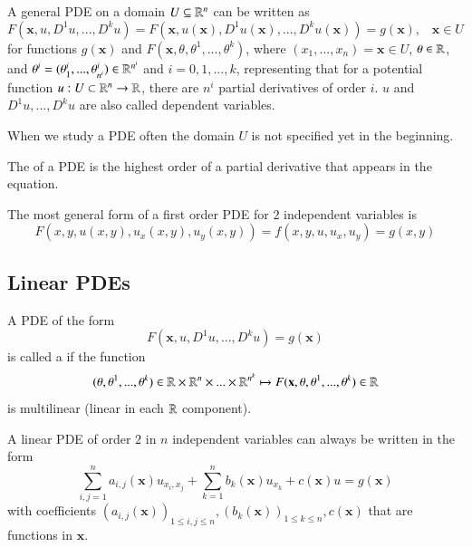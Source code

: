 \documentclass[12pt, a4paper, oneside, openright, titlepage]{book}
\begin{document}
A general PDE on a domain $U \subseteq \mathbb R^n$ can be written as \begin{equation}
    F(\mathbf{x},u,D^1u,...,D^ku) = F(\mathbf{x},u(\mathbf{x}),D^1u(\mathbf{x}),...,D^ku(\mathbf{x})) = g(\mathbf{x}),\;\;\;\mathbf{x} \in U
\end{equation}
for functions $g(\mathbf{x})$ and $F(\mathbf{x},\theta,\theta^1,...,\theta^k)$, where $(x_1,...,x_n) = \mathbf{x} \in U$, $\theta \in \mathbb R$, and $\theta^i = (\theta^i_1,...,\theta^i_{n^i}) \in \mathbb R^{n^i}$ and $i = 0,1,...,k$, representing that for a potential function $u:U\subset\mathbb R^n\rightarrow \mathbb R$, there are $n^i$ partial derivatives of order $i$. $u$ and $D^1u,...,D^ku$ are also called dependent variables.

When we study a PDE often the domain $U$ is not specified yet in the beginning.

\begin{defn}
    The  of a PDE is the highest order of a partial derivative that appears in the equation.
\end{defn}

The most general form of a first order PDE for $2$ independent variables is \begin{equation*}
    F(x,y,u(x,y),u_x(x,y),u_y(x,y)) = f(x,y,u,u_x,u_y) = g(x,y)
\end{equation*}


\subsection{Linear PDEs}


\begin{defn}
    A PDE of the form \begin{equation}
        F(\mathbf{x},u,D^1u,...,D^ku) = g(\mathbf{x})
    \end{equation}
    is called a  if the function \begin{equation*}
        (\theta,\theta^1,...,\theta^k)\in\mathbb R\times \mathbb R^n\times...\times \mathbb R^{n^k}\mapsto F(\mathbf{x},\theta,\theta^1,...,\theta^k)\in \mathbb R
    \end{equation*}
    is multilinear (linear in each $\mathbb R$ component).
\end{defn}


A linear PDE of order $2$ in $n$ independent variables can always be written in the form \begin{equation*}
    \sum_{i,j=1}^na_{i,j}(\mathbf{x})u_{x_i,x_j} + \sum_{k=1}^nb_k(\mathbf{x})u_{x_k}+c(\mathbf{x})u = g(\mathbf{x})
\end{equation*}
with coefficients $(a_{i,j}(\mathbf{x}))_{1\leq i,j\leq n},(b_k(\mathbf{x}))_{1\leq k\leq n},c(\mathbf{x})$ that are functions in $\mathbf{x}$.
\end{document}

